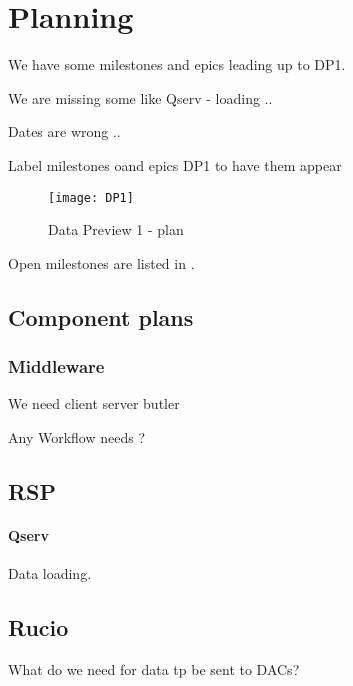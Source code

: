 \section{Planning} \label{sec:plan}

We have some milestones and epics leading up to DP1.

We are missing some like Qserv - loading ..

Dates are wrong ..

Label milestones oand epics DP1 to have them appear

\begin{figure}
\begin{centering}
\texttt{[image: DP1]}
	\caption{Data Preview 1 - plan \label{fig:plan}}
\end{centering}
\end{figure}



Open milestones are listed in .



\subsection{Component plans}
\subsubsection{Middleware}
We need client server butler 

Any Workflow needs ?

\subsection{RSP}

\paragraph{Qserv}
Data loading.


\subsection{Rucio}
What do we need for data tp be sent to DACs?

